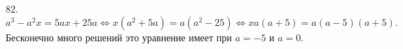 82. $a^3-a^2x=5ax+25a\Leftrightarrow x(a^2+5a)=a(a^2-25)\Leftrightarrow xa(a+5)=a(a-5)(a+5).$ Бесконечно много решений это уравнение имеет при $a=-5$ и $a=0.$\\
